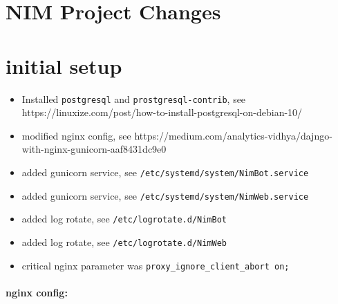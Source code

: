 \documentclass{article}
\begin{document}
\section{NIM Project Changes}

\section{initial setup}

\begin{itemize}
    \item Installed \verb|postgresql| and \verb|prostgresql-contrib|,  see https://linuxize.com/post/how-to-install-postgresql-on-debian-10/
    \item modified nginx config, see https://medium.com/analytics-vidhya/dajngo-with-nginx-gunicorn-aaf8431dc9e0
    \item added gunicorn service, see \verb|/etc/systemd/system/NimBot.service|
    \item added gunicorn service, see \verb|/etc/systemd/system/NimWeb.service|
    \item added log rotate, see \verb|/etc/logrotate.d/NimBot|
    \item added log rotate, see \verb|/etc/logrotate.d/NimWeb|
    \item critical nginx parameter was \verb|proxy_ignore_client_abort on;|
\end{itemize}

\paragraph{nginx config:}
\end{document}
